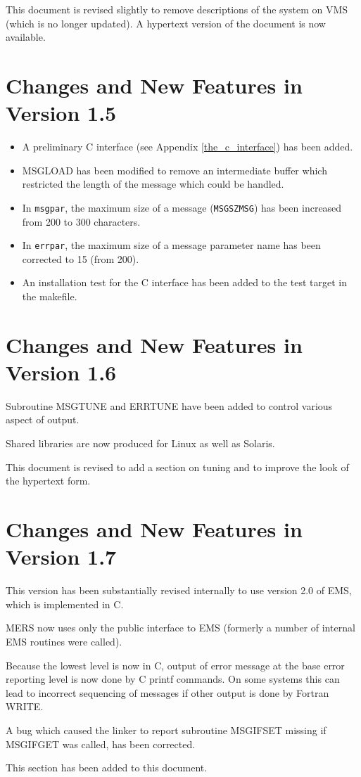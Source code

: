 \documentclass[twoside,11pt]{article}
\newcommand{\htmlref}[2]{#1}
\newcommand{\latex}[1]{#1}
\newcommand{\xref}[3]{#1}
\newcommand{\xlabel}[1]{}
\renewcommand{\_}{\texttt{\symbol{95}}}
\begin{document}
This document is revised slightly to remove descriptions of the system on VMS
(which is no longer updated). A hypertext version of the document is now
available.

\section{\xlabel{changes_and_new_features_in_version_1_5}Changes and New Features in Version 1.5}
\begin{itemize}
\item A preliminary 
\htmlref{C interface}{the_c_interface}\latex{ (see Appendix
\ref{the_c_interface})} has been added.
\item MSG\_LOAD has been modified to remove an intermediate buffer which
restricted the length of the message which could be handled.
\item In \texttt{msg\_par}, the maximum size of a message 
(\texttt{MSG\_\_SZMSG}) has been increased from 200 to 300 characters.
\item In \texttt{err\_par}, the maximum size of a message parameter name has
been corrected to 15 (from 200).
\item An installation test for the C interface has been added to the test
target in the makefile.
\end{itemize}

\section{\xlabel{changes_and_new_features_in_version_1_6}Changes and New Features in Version 1.6}
Subroutine 
\htmlref{MSG\_TUNE}{MSG_TUNE}
and
\htmlref{ERR\_TUNE}{ERR_TUNE}
have been added to control various aspect of output.

Shared libraries are now produced for Linux as well as Solaris.

This document is revised to add a section on 
\htmlref{tuning}{tuning} and to improve the look of the hypertext form.

\section{\xlabel{changes_and_new_features_in_version_1_7}Changes and New Features in Version 1.7}
This version has been substantially revised internally to use version 2.0 of
\xref{EMS}{ssn4}{},
which is implemented in C.

MERS now uses only the public interface to EMS (formerly a number of internal
EMS routines were called).

Because the lowest level is now in C, output of error message at the base
error reporting level is now done by C printf commands. On some systems this
can lead to incorrect sequencing of messages if other output is done by
Fortran WRITE.

A bug which caused the linker to report subroutine MSG\_IFSET missing if
MSG\_IFGET was called, has been corrected.

This section has been added to this document.
\end{document}
